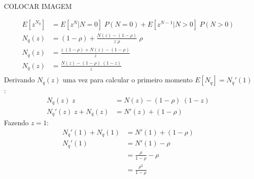 \documentclass[a4paper]{article}
\newcommand{\E}[1]{E\!\left[#1\right]}
\begin{document}
\begin{center}
    COLOCAR IMAGEM
\end{center}
\begin{align*}
    \E{z^{N_q}} &= \E{z^N| N = 0} \; P(N = 0)
        + \E{z^{N-1} | N > 0} \;P(N > 0) \\
    N_q(z) &= (1 - \rho) + \frac{N(z) - (1 - \rho)}{z \; \rho}
        \; \rho \\
    N_q(z) &= \frac{z \; (1 - \rho) + N(z) - (1 - \rho)}{z} \\
    N_q(z) &= \frac{N(z) - (1 - \rho) \; (1 - z)}{z} \\
\end{align*}
Derivando \(N_q(z)\) uma vez para calcular o primeiro momento
\(\E{N_q} = N_q'(1)\):
\begin{align*}
    N_q(z) \; z &= N(z) - (1 - \rho) \; (1 - z) \\
    N_q'(z) \; z + N_q(z) &= N'(z) + (1 - \rho)
\end{align*}
Fazendo \(z = 1\):
\begin{align*}
    N_q'(1) + N_q(1) &= N'(1) + (1 - \rho) \\
    N_q'(1) &= N'(1) - \rho \\
    &= \frac{\rho}{1 - \rho} - \rho \\
    &= \frac{\rho^2}{1 - \rho}
\end{align*}
\end{document}
